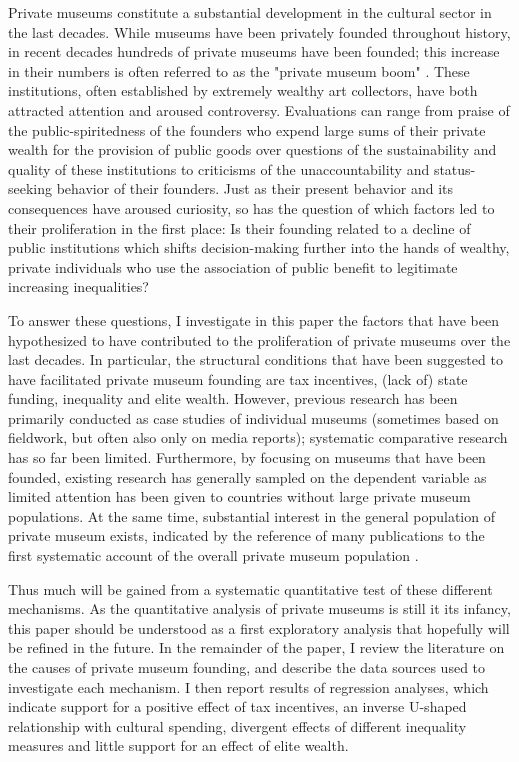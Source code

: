 \documentclass[11pt]{article}
\begin{document}
Private museums constitute a substantial development in the cultural sector in the last decades.
While museums have been privately founded throughout history, in recent decades hundreds of private museums have been founded; this increase in their numbers is often referred to as the "private museum boom" \parencite{Walker_2019_collector}. 
These institutions, often established by extremely wealthy art collectors, have both attracted attention and aroused controversy.
Evaluations can range from praise of the public-spiritedness of the founders who expend large sums of their private wealth for the provision of public goods over questions of the sustainability and quality of these institutions to criticisms of the unaccountability and status-seeking behavior of their founders. 
Just as their present behavior and its consequences have aroused curiosity, so has the question of which factors led to their proliferation in the first place:
Is their founding related to a decline of public institutions which shifts decision-making further into the hands of wealthy, private individuals who use the association of public benefit to legitimate increasing inequalities?



To answer these questions, I investigate in this paper the factors that have been hypothesized to have contributed to the proliferation of private museums over the last decades.
In particular, the structural conditions that have been suggested to have facilitated private museum founding are tax incentives, (lack of) state funding, inequality and elite wealth.
However, previous research has been primarily conducted as case studies of individual museums (sometimes based on fieldwork, but often also only on media reports); systematic comparative research has so far been limited.
Furthermore, by focusing on museums that have been founded, existing research has generally sampled on the dependent variable as limited attention has been given to countries without large private museum populations.
At the same time, substantial interest in the general population of private museum exists, indicated by the reference of many publications to the first systematic account of the overall private museum population \parencite{LarrysList_2015_report}. 

Thus much will be gained from a systematic quantitative test of these different mechanisms.
As the quantitative analysis of private museums is still it its infancy, this paper should be understood as a first exploratory analysis that hopefully will be refined in the future. 
In the remainder of the paper, I review the literature on the causes of private museum founding, and describe the data sources used to investigate each mechanism.
I then report results of regression analyses, which indicate support for a positive effect of tax incentives, an inverse U-shaped relationship with cultural spending, divergent effects of different inequality measures and little support for an effect of elite wealth.
\end{document}
